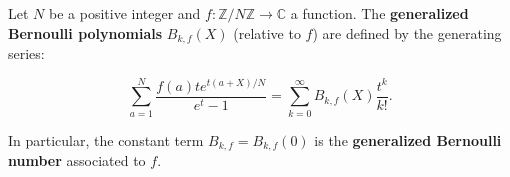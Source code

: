 Let $N$ be a positive integer and $f: \mathbb{Z}/N\mathbb{Z} \to \mathbb{C}$ a function.
The \textbf{generalized Bernoulli polynomials} $B_{k,f}(X)$ (relative to $f$) are
defined by the generating series:

$$\sum_{a=1}^{N} \frac{f(a) t e^{t(a+X)/N}}{e^t - 1} = \sum_{k=0}^{\infty} B_{k,f}(X) \frac{t^k}{k!}.$$

In particular, the constant term $B_{k,f} = B_{k,f}(0)$ is the
\textbf{generalized Bernoulli number} associated to $f$.
